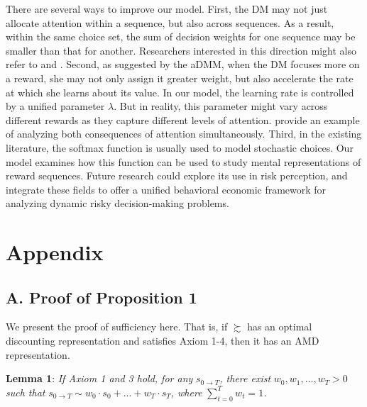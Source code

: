 \documentclass[
  12pt,
]{article}
\begin{document}
There are several ways to improve our model. First, the DM may not just
allocate attention within a sequence, but also across sequences. As a
result, within the same choice set, the sum of decision weights for one
sequence may be smaller than that for another. Researchers interested in
this direction might also refer to \citet{manzini2014stochastic} and
\citet{gossner2021attention}. Second, as suggested by the aDMM, when the
DM focuses more on a reward, she may not only assign it greater weight,
but also accelerate the rate at which she learns about its value. In our
model, the learning rate is controlled by a unified parameter
\(\lambda\). But in reality, this parameter might vary across different
rewards as they capture different levels of attention.
\citet{leong2017dynamic} provide an example of analyzing both
consequences of attention simultaneously. Third, in the existing
literature, the softmax function is usually used to model stochastic
choices. Our model examines how this function can be used to study
mental representations of reward sequences. Future research could
explore its use in risk perception, and integrate these fields to offer
a unified behavioral economic framework for analyzing dynamic risky
decision-making problems.

\renewcommand\refname{Reference}
  

\newpage

\hypertarget{appendix}{%
\section*{Appendix}\label{appendix}}

\hypertarget{a.-proof-of-proposition-1}{%
\subsection*{A. Proof of Proposition
1}\label{a.-proof-of-proposition-1}}

We present the proof of sufficiency here. That is, if \(\succsim\) has
an optimal discounting representation and satisfies Axiom 1-4, then it
has an AMD representation.

\noindent \textbf{Lemma 1}: \emph{If Axiom 1 and 3 hold, for any}
\(s_{0\rightarrow T}\)\emph{, there exist} \(w_0, w_1, …, w_T > 0\)
\emph{such that}
\(s_{0\rightarrow T} \sim w_0 \cdot s_0 + ...+w_T\cdot s_T\)\emph{,
where} \(\sum_{t=0}^T w_t=1\)\emph{.}
\end{document}
